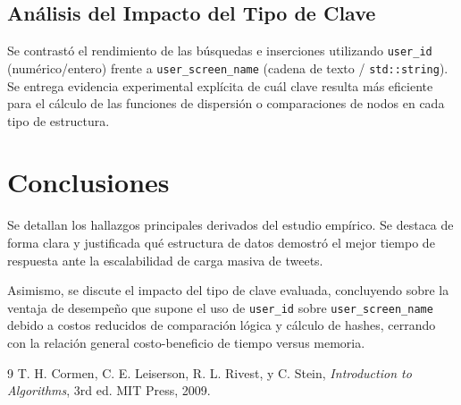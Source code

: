 \documentclass[11pt,letterpaper]{article}
\begin{document}

\subsection{Análisis del Impacto del Tipo de Clave}
Se contrastó el rendimiento de las búsquedas e inserciones utilizando \texttt{user\_id} (numérico/entero) frente a \texttt{user\_screen\_name} (cadena de texto / \texttt{std::string}). Se entrega evidencia experimental explícita de cuál clave resulta más eficiente para el cálculo de las funciones de dispersión o comparaciones de nodos en cada tipo de estructura.


\section{Conclusiones}
\label{sec:conclusiones}

Se detallan los hallazgos principales derivados del estudio empírico. Se destaca de forma clara y justificada qué estructura de datos demostró el mejor tiempo de respuesta ante la escalabilidad de carga masiva de tweets.

Asimismo, se discute el impacto del tipo de clave evaluada, concluyendo sobre la ventaja de desempeño que supone el uso de \texttt{user\_id} sobre \texttt{user\_screen\_name} debido a costos reducidos de comparación lógica y cálculo de hashes, cerrando con la relación general costo-beneficio de tiempo versus memoria.

\newpage
\begin{thebibliography}{9}
T. H. Cormen, C. E. Leiserson, R. L. Rivest, y C. Stein, \textit{Introduction to Algorithms}, 3rd ed. MIT Press, 2009.
\end{thebibliography}
\end{document}
